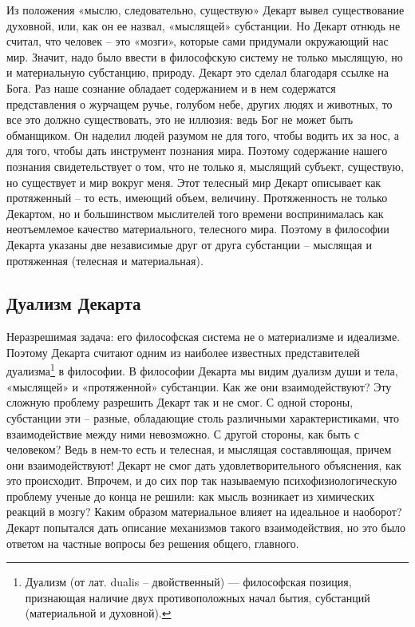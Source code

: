 \documentclass[a4paper, 14pt]{extreport}
\begin{document}
Из положения «мыслю, следовательно, существую» Декарт вывел
существование духовной, или, как он ее назвал, «мыслящей» субстанции. Но
Декарт отнюдь не считал, что человек -- это «мозги», которые сами
придумали окружающий нас мир. Значит, надо было ввести в философскую
систему не только мыслящую, но и материальную субстанцию, природу.
Декарт это сделал благодаря ссылке на Бога. Раз наше сознание обладает
содержанием и в нем содержатся представления о журчащем ручье, голубом
небе, других людях и животных, то все это должно существовать, это не
иллюзия: ведь Бог не может быть обманщиком. Он наделил людей разумом не
для того, чтобы водить их за нос, а для того, чтобы дать инструмент
познания мира. Поэтому содержание нашего познания свидетельствует о том,
что не только я, мыслящий субъект, существую, но существует и мир вокруг
меня. Этот телесный мир Декарт описывает как протяженный -- то есть,
имеющий объем, величину. Протяженность не только Декартом, но и
большинством мыслителей того времени воспринималась как неотъемлемое
качество материального, телесного мира. Поэтому в философии Декарта
указаны две независимые друг от друга субстанции -- мыслящая и
протяженная (телесная и материальная).

\subsection{Дуализм Декарта}

Неразрешимая задача: его философская система не о материализме и
идеализме. Поэтому Декарта считают одним из наиболее известных
представителей дуализма\footnote{Дуализм (от лат. dualis --
  двойственный) --- философская позиция, признающая наличие двух
  противоположных начал бытия, субстанций (материальной и духовной).} в
философии. В философии Декарта мы видим дуализм души и тела, «мыслящей»
и «протяженной» субстанции. Как же они взаимодействуют? Эту сложную
проблему разрешить Декарт так и не смог. С одной стороны, субстанции эти
-- разные, обладающие столь различными характеристиками, что
взаимодействие между ними невозможно. С другой стороны, как быть с
человеком? Ведь в нем-то есть и телесная, и мыслящая составляющая,
причем они взаимодействуют! Декарт не смог дать удовлетворительного
объяснения, как это происходит. Впрочем, и до сих пор так называемую
психофизиологическую проблему ученые до конца не решили: как мысль
возникает из химических реакций в мозгу? Каким образом материальное
влияет на идеальное и наоборот? Декарт попытался дать описание
механизмов такого взаимодействия, но это было ответом на частные вопросы
без решения общего, главного.
\end{document}
